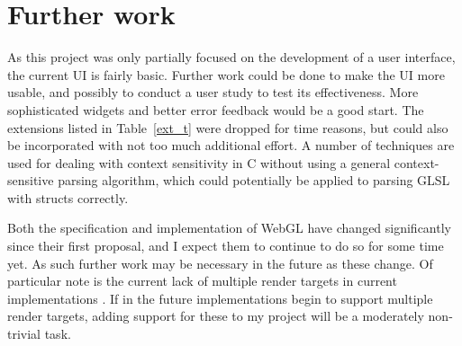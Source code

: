 \documentclass[12pt,twoside,notitlepage]{report}
\begin{document}
\section{Further work}
As this project was only partially focused on the development of a user interface, the current UI is fairly basic. Further work could be done to make the UI more usable, and possibly to conduct a user study to test its effectiveness. More sophisticated widgets and better error feedback would be a good start. The extensions listed in Table~\ref{ext_t} were dropped for time reasons, but could also be incorporated with not too much additional effort. A number of techniques are used for dealing with context sensitivity in C without using a general context-sensitive parsing algorithm, which could potentially be applied to parsing GLSL with structs correctly.

Both the specification and implementation of WebGL have changed significantly since their first proposal, and I expect them to continue to do so for some time yet. As such further work may be necessary in the future as these change. Of particular note is the current lack of multiple render targets in current implementations \cite{webgl-future}. If in the future implementations begin to support multiple render targets, adding support for these to my project will be a moderately non-trivial task.

\cleardoublepage



\cleardoublepage

\appendix



\end{document}
